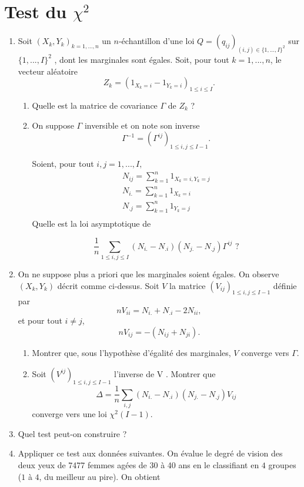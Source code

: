 \section{Test du $\chi^2$}
\begin{enumerate}
\item Soit $(X_k , Y_k )_{k=1,...,n}$ un $n$-échantillon d’une loi $Q = (q_{ij} )_{(i,j)\in \{1,...,I\}^2}$ sur $\{1, . . . , I\}^2$ ,
dont les marginales sont égales.
Soit, pour tout $k = 1, . . . , n$, le vecteur aléatoire
\[Z_k = (1_{X_k =i} - 1_{Y_k =i} )_{1\leq i \leq I} .\]
\begin{enumerate}
 \item Quelle est la matrice de covariance $\Gamma$ de $Z_k$ ?
\item On suppose $\Gamma$ inversible et on note son inverse
\[\Gamma^{-1} = (\Gamma^{ij})_{1\leq i,j\leq I-1} .\]

Soient, pour tout $i, j = 1, . . . , I,$
\[\begin{array}{l} N_{ij} =  \sum_{k = 1}^{n} 1_{X_k =i,Y_k =j} \\

	N_{i.} = \sum_{k = 1}^{n} 1_{X_k =i} \\ 

	N_{.j} = \sum_{k = 1}^{n} 1_{Y_k =j} \\
\end{array}
\]
Quelle est la loi asymptotique de

\[\frac{1}{n}\sum_{1\leq i,j \leq I}(N_{i.} - N_{.i} )(N_{j.} - N_{.j} )\Gamma^{ij} \text{   ?}\]
\end{enumerate}

\item On ne suppose plus a priori que les marginales soient égales. On observe $(X_k , Y_k )$
décrit comme ci-dessus. Soit $V$ la matrice $(V_{ij} )_{1\leq i,j\leq I-1}$ définie par
\[ nV_{ii} = N_{i. }+ N_{.i} - 2N_{ii} , \]
et pour tout $i \neq  j$,
\[nV_{ij} = -(N_{ij} + N_{ji} ).\]
\begin{enumerate}
\item Montrer que, sous l’hypothèse d’égalité des marginales, $V$ converge vers $\Gamma$.
\item Soit $(V^{ij} )_{ 1\leq i,j\leq I-1} $ l’inverse de V . Montrer que
\[\Delta= \frac{1}{n}\sum_{i,j} (N_{i.} - N_{.i} )(N_{j.} - N_{.j} )V _{ij}\]
converge vers une loi $\chi^2 (I - 1)$.
\end{enumerate}

\item Quel test peut-on construire ?
\item Appliquer ce test aux données suivantes. On évalue le degré de vision des deux yeux de 7477 femmes agées de 30 à 40 ans en le classifiant en $4$ groupes ($1$ à $4$, du meilleur au pire). On obtient \\


\end{enumerate}
